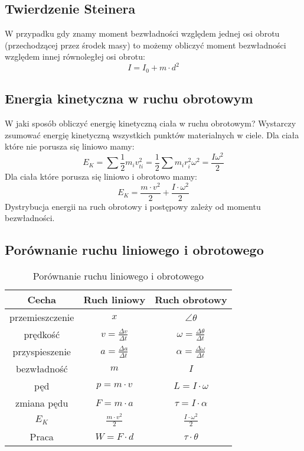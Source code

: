 \documentclass{../notatki}
\begin{document}
\subsection{Twierdzenie Steinera}

W przypadku gdy znamy moment bezwładności względem jednej osi obrotu
(przechodzącej przez środek masy) to możemy obliczyć moment bezwładności
względem innej równoległej osi obrotu:
$$
I = I_0 + m \cdot d^2
$$

\subsection{Energia kinetyczna w ruchu obrotowym}

W jaki sposób obliczyć energię kinetyczną ciała w ruchu obrotowym? Wystarczy
zsumować energię kinetyczną wszystkich punktów materialnych w ciele.
Dla ciała które nie porusza się liniowo mamy:
$$
E_K = \sum \frac{1}{2} m_i v_{ti}^2 = \frac{1}{2} \sum m_i r_i^2 \omega^2 =
\frac{I\omega^2}{2}
$$
Dla ciała które porusza się liniowo i obrotowo mamy:
$$
E_K = \frac{m \cdot v^2}{2} + \frac{I \cdot \omega^2}{2}
$$
Dystrybucja energii na ruch obrotowy i postępowy zależy od momentu bezwładności.

\subsection{Porównanie ruchu liniowego i obrotowego}

\begin{table*}[ht]
  \centering
  \begin{tabular}{c|c|c}
    Cecha & Ruch liniowy & Ruch obrotowy \\ \hline
    przemieszczenie & $x$ & $\angle \theta$ \\ \hline
    prędkość & $v = \frac{\Delta v}{\Delta t}$ & $\omega =
    \frac{\Delta \theta}{\Delta t}$ \\ \hline
    przyspieszenie & $a = \frac{\Delta a}{\Delta t}$ & $\alpha =
    \frac{\Delta \omega}{\Delta t}$ \\ \hline
    bezwładność & $m$ & $I$ \\ \hline
    pęd & $p = m \cdot v$ & $L = I \cdot \omega$ \\ \hline
    zmiana pędu & $F = m \cdot a$ & $\tau = I \cdot \alpha$ \\ \hline
    $E_K$ & $\frac{m \cdot v^2}{2}$ & $\frac{I \cdot \omega^2}{2}$ \\ \hline
    Praca & $W = F \cdot d$ & $\tau \cdot \theta$
  \end{tabular}
  \caption{Porównanie ruchu liniowego i obrotowego}
\end{table*}
\end{document}
